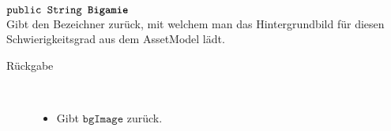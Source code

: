 \begin{description}
		\item $\texttt{public String \textbf{Bigamie}}$ \\ Gibt den Bezeichner zurück, mit welchem man das Hintergrundbild für diesen Schwierigkeitsgrad aus dem AssetModel lädt.
		\begin{description}
			\item[Rückgabe] \hfill \\
			\vspace{-.8cm}
			\begin{itemize}
				\item Gibt $\texttt{bgImage}$ zurück.
			\end{itemize}
			\end{description}

		
	\end{description}

